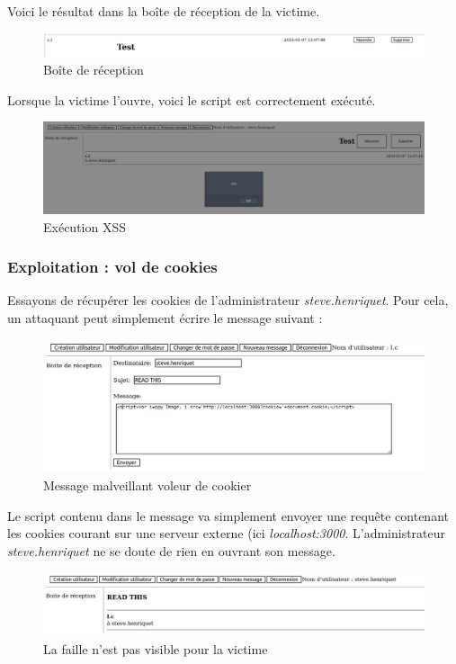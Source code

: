 \documentclass[12pt]{article}
\begin{document}
Voici le résultat dans la boîte de réception de la victime.
\begin{figure}[H]
\centering
\includegraphics[width=\linewidth]{images/xssRecep.png}
\caption{Boîte de réception}
\end{figure}

Lorsque la victime l'ouvre, voici le script est correctement exécuté.
\begin{figure}[H]
\centering
\includegraphics[width=\linewidth]{images/xssOpen.png}
\caption{Exécution XSS}
\end{figure}

\subsubsection{Exploitation : vol de cookies}
Essayons de récupérer les cookies de l'administrateur \textit{steve.henriquet}. Pour cela, un attaquant peut simplement écrire le message suivant : 

\begin{figure}[H]
\centering
\includegraphics[width=\linewidth]{images/cookieStealer.png}
\caption{Message malveillant voleur de cookier}
\end{figure}

Le script contenu dans le message va simplement envoyer une requête contenant les cookies courant sur une serveur externe (ici \textit{localhost:3000}. L'administrateur \textit{steve.henriquet} ne se doute de rien en ouvrant son message.

\begin{figure}[H]
\centering
\includegraphics[width=\linewidth]{images/cookieStealing.png}
\caption{La faille n'est pas visible pour la victime}
\end{figure}
\end{document}
